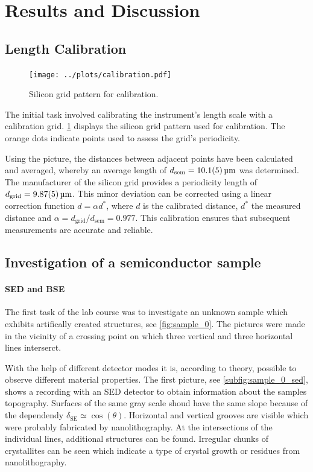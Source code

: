 \section{Results and Discussion}
\subsection{Length Calibration}

\begin{figure}
	\centering
	\texttt{[image: ../plots/calibration.pdf]}
	\caption{Silicon grid pattern for calibration.}
	\label{fig:calibration}
\end{figure}

The initial task involved calibrating the instrument's length scale with a calibration grid.
\cref{fig:calibration} displays the silicon grid pattern
used for calibration.
The orange dots indicate points used to assess the grid's periodicity.

Using the picture, the distances between adjacent points have
been calculated and averaged, whereby an average length of
$d_{\mathrm{sem}}=\qty{10.1 \pm 0.5}{\micro\meter}$ was determined.
The manufacturer of the silicon grid provides a periodicity length of
$d_{\mathrm{grid}}=\qty{9.87\pm 0.05}{\micro\meter}$.
This minor deviation can be corrected using a linear
correction function $d = \alpha d^*$, where $d$ is the calibrated
distance, $d^*$ the measured distance and
$\alpha=d_{\mathrm{grid}} /d_{\mathrm{sem}} = \num{0.977}$.
This calibration ensures that subsequent measurements are accurate and
reliable.

\subsection{Investigation of a semiconductor sample}
\paragraph{SED and BSE}
The first task of the lab course was to investigate an unknown sample which
exhibits artifically created structures, see \cref{fig:sample_0}.
The pictures were made in the vicinity of a crossing
point on which three vertical and three horizontal lines interserct.

With the help of different detector modes it is, according to theory,
possible to observe different material properties.
The first picture, see \cref{subfig:sample_0_sed}, shows a recording
with an SED detector to obtain information about the samples topography.
Surfaces of the same gray scale shoud have the same slope because of the
dependendy $\delta_\mathrm{SE} \simeq \cos(\theta)$.
Horizontal and vertical grooves are visible which were probably
fabricated by nanolithography.
At the intersections of the individual lines, additional structures can
be found.
Irregular chunks of crystallites can be seen which indicate
a type of crystal growth or residues from nanolithography.

